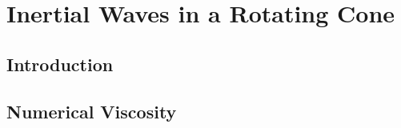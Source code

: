 \chapter{Inertial Waves in a Rotating Cone}


\section{Introduction}



\section{Numerical Viscosity}
